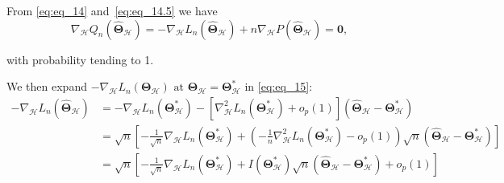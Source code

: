 \documentclass[12pt,letter]{article}\usepackage[]{graphicx}\usepackage[]{color}
\newcommand{\btheta}{\boldsymbol{\theta}}
\begin{document}

From \eqref{eq:eq_14} and~\eqref{eq:eq_14.5} we have
\begin{equation}
\nabla_{\mathcal{H}}Q_{n}\left(\widehat{\boldsymbol{\Theta}}_{\mathcal{H}}\right)=-\nabla_{\mathcal{H}}L_{n}\left(\widehat{\boldsymbol{\Theta}}_{\mathcal{H}}\right)+n\nabla_{\mathcal{H}}P\left(\widehat{\boldsymbol{\Theta}}_{\mathcal{H}}\right)=\mathbf{0},\label{eq:eq_15}
\end{equation}

with probability tending to 1. 

We then expand $-\nabla_{\mathcal{H}}L_{n}\left(\boldsymbol{\Theta}_{\mathcal{H}}\right)\text{ at }\boldsymbol{\Theta}_{\mathcal{H}}=\boldsymbol{\Theta}_{\mathcal{H}}^{*}$ in \eqref{eq:eq_15}:
	\[
	\begin{aligned}-\nabla_{\mathcal{H}}L_{n}\left(\widehat{\boldsymbol{\Theta}}_{\mathcal{H}}\right) & =-\nabla_{\mathcal{H}}L_{n}\left(\boldsymbol{\Theta}_{\mathcal{H}}^{*}\right)-\left[\nabla_{\mathcal{H}}^{2}L_{n}\left(\boldsymbol{\Theta}_{\mathcal{H}}^{*}\right)+o_{p}(1)\right]\left(\widehat{\boldsymbol{\Theta}}_{\mathcal{H}}-\boldsymbol{\Theta}_{\mathcal{H}}^{*}\right)\\
	& =\sqrt{n}\left[-\frac{1}{\sqrt{n}}\nabla_{\mathcal{H}}L_{n}\left(\boldsymbol{\Theta}_{\mathcal{H}}^{*}\right)+\left(-\frac{1}{n}\nabla_{\mathcal{H}}^{2}L_{n}\left(\boldsymbol{\Theta}_{\mathcal{H}}^{*}\right)-o_{p}(1)\right)\sqrt{n}\left(\widehat{\boldsymbol{\Theta}}_{\mathcal{H}}-\boldsymbol{\Theta}_{\mathcal{H}}^{*}\right)\right]\\
	& =\sqrt{n}\left[-\frac{1}{\sqrt{n}}\nabla_{\mathcal{H}}L_{n}\left(\boldsymbol{\Theta}_{\mathcal{H}}^{*}\right)+I\left(\boldsymbol{\Theta}_{\mathcal{H}}^{*}\right)\sqrt{n}\left(\widehat{\boldsymbol{\Theta}}_{\mathcal{H}}-\boldsymbol{\Theta}_{\mathcal{H}}^{*}\right)+o_{p}(1)\right]
	\end{aligned}
	\]
\end{document}
